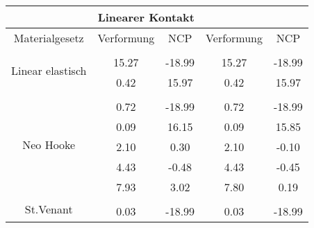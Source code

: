 \begin{table} 
\centering 
\begin{tabular}{c|cc|cc|} 
\cline{2-5} 
 & \multicolumn{2}{|c|}{Linearer Kontakt} &  \\ 
\hline 
\multicolumn{1}{|c|}{Materialgesetz} & \multicolumn{1}{c|}{Verformung} & \multicolumn{1}{c|}{NCP} & \multicolumn{1}{c|}{Verformung} & \multicolumn{1}{c|}{NCP} \\ 
\hline 
\multicolumn{1}{|c|}{\multirow{3}{*}{Linear elastisch}} &\multicolumn{1}{|c|}{} & \multicolumn{1}{|c|}{} & \multicolumn{1}{|c|}{} & \multicolumn{1}{|c|}{} \\ 
\multicolumn{1}{|c|}{} & \multicolumn{1}{|c|}{     15.27} & \multicolumn{1}{|c|}{    -18.99} & \multicolumn{1}{|c|}{     15.27} & \multicolumn{1}{|c|}{    -18.99} \\ 
\multicolumn{1}{|c|}{} & \multicolumn{1}{|c|}{      0.42} & \multicolumn{1}{|c|}{     15.97} & \multicolumn{1}{|c|}{      0.42} & \multicolumn{1}{|c|}{     15.97} \\ 
\hline 
\multicolumn{1}{|c|}{\multirow{6}{*}{Neo Hooke}} &\multicolumn{1}{|c|}{} & \multicolumn{1}{|c|}{} & \multicolumn{1}{|c|}{} & \multicolumn{1}{|c|}{} \\ 
\multicolumn{1}{|c|}{} & \multicolumn{1}{|c|}{      0.72} & \multicolumn{1}{|c|}{    -18.99} & \multicolumn{1}{|c|}{      0.72} & \multicolumn{1}{|c|}{    -18.99} \\ 
\multicolumn{1}{|c|}{} & \multicolumn{1}{|c|}{      0.09} & \multicolumn{1}{|c|}{     16.15} & \multicolumn{1}{|c|}{      0.09} & \multicolumn{1}{|c|}{     15.85} \\ 
\multicolumn{1}{|c|}{} & \multicolumn{1}{|c|}{      2.10} & \multicolumn{1}{|c|}{      0.30} & \multicolumn{1}{|c|}{      2.10} & \multicolumn{1}{|c|}{     -0.10} \\ 
\multicolumn{1}{|c|}{} & \multicolumn{1}{|c|}{      4.43} & \multicolumn{1}{|c|}{     -0.48} & \multicolumn{1}{|c|}{      4.43} & \multicolumn{1}{|c|}{     -0.45} \\ 
\multicolumn{1}{|c|}{} & \multicolumn{1}{|c|}{      7.93} & \multicolumn{1}{|c|}{      3.02} & \multicolumn{1}{|c|}{      7.80} & \multicolumn{1}{|c|}{      0.19} \\ 
\hline 
\multicolumn{1}{|c|}{\multirow{6}{*}{St.Venant}} &\multicolumn{1}{|c|}{} & \multicolumn{1}{|c|}{} & \multicolumn{1}{|c|}{} & \multicolumn{1}{|c|}{} \\ 
\multicolumn{1}{|c|}{} & \multicolumn{1}{|c|}{      0.03} & \multicolumn{1}{|c|}{    -18.99} & \multicolumn{1}{|c|}{      0.03} & \multicolumn{1}{|c|}{    -18.99} \\ 

\end{tabular}
\end{table}
